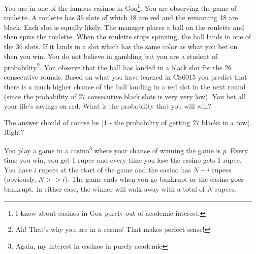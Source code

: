 \documentclass[solution,addpoints,12pt]{exam}
\begin{document}
\begin{questions}
\question[1] You are in one of the famous casinos in Goa\footnote{I know about casinos in Goa purely out of academic interest.}. You are observing the game of roulette. A roulette has 36 slots of which 18 are red and the remaining 18 are black. Each slot is equally likely. The manager places a ball on the roulette and then spins the roulette. When the roulette stops spinning, the ball lands in one of the 36 slots. If it lands in a slot which has the same color as what you bet on then you win. You do not believe in gambling but you are a student of probability\footnote{Ah! That's why you are in a casino! That makes perfect sense!}. You observe that the ball has landed in a black slot for the 26 consecutive rounds. Based on what you have learned in CS6015 you predict that there is a much higher chance of the ball landing in a red slot in the next round (since the probability of 27 consecutive black slots is very very low). You bet all your life's savings on red. What is the probability that you will win?

\begin{solution}
 The answer should of course be (1 - the probability of getting 27 blacks in a row). Right?
\end{solution}



\question[2] 
You play a game in a casino\footnote{Again, my interest in casinos in purely academic} where your chance of winning the game is $p$. Every time you win, you get 1 rupee and every time you lose the casino gets 1 rupee. You have $i$ rupees at the start of the game and the casino has $N - i$ rupees (obviously, $N >> i$). The game ends when you go bankrupt or the casino goes bankrupt. In either case, the winner will walk away with a total of $N$ rupees. 

\end{questions}
\end{document}
